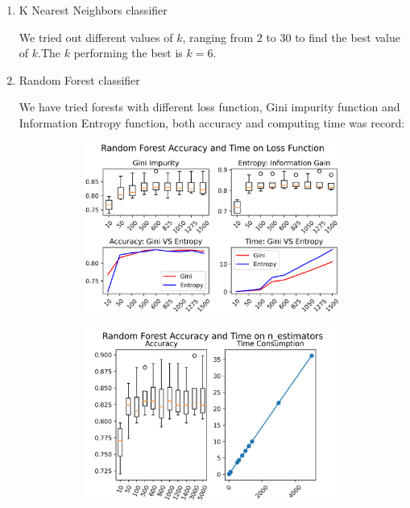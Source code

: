 \documentclass[11.5pt]{article}
\begin{document}
\begin{enumerate}
\begin{itemize}
\begin{enumerate}
                \item K Nearest Neighbors classifier

                We tried out different values of $k$, ranging from $2$ to $30$ to find the best value of $k$.The $k$ performing the best is $k = 6$.
                \item Random Forest classifier

                We have tried forests with different loss function, Gini impurity function and Information Entropy function, both accuracy and computing time was record:

                \begin{figure}[h!]
                    \begin{subfigure}[b]{0.5\linewidth}
                        \centering
                        \includegraphics[width=0.75\linewidth]{images/rand_forest_loss_func.png}
                    \end{subfigure}
                    \begin{subfigure}[b]{0.5\linewidth}
                        \centering
                        \includegraphics[width=0.75\linewidth]{images/rand_forest_n_estimators.png}
                    \end{subfigure}
                \end{figure}


\end{enumerate}
\end{itemize}
\end{enumerate}
\end{document}
